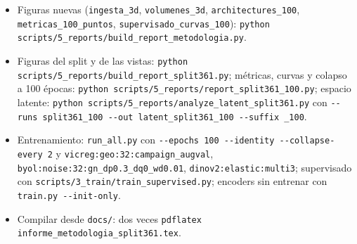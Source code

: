 \documentclass[11pt,a4paper]{article}
\begin{document}
\begin{itemize}
\item Figuras nuevas (\texttt{ingesta\_3d}, \texttt{volumenes\_3d}, \texttt{architectures\_100},
  \texttt{metricas\_100\_puntos}, \texttt{supervisado\_curvas\_100}):
  \texttt{python scripts/5\_reports/build\_report\_metodologia.py}.
\item Figuras del split y de las vistas: \texttt{python scripts/5\_reports/build\_report\_split361.py};
  métricas, curvas y colapso a 100 épocas: \texttt{python scripts/5\_reports/report\_split361\_100.py}; espacio
  latente: \texttt{python scripts/5\_reports/analyze\_latent\_split361.py} con \texttt{-{}-runs split361\_100
  -{}-out latent\_split361\_100 -{}-suffix \_100}.
\item Entrenamiento: \texttt{run\_all.py} con \texttt{-{}-epochs 100 -{}-identity -{}-collapse-every 2}
  y \nolinkurl{vicreg:geo:32:campaign_augval}, \nolinkurl{byol:noise:32:gn_dp0.3_dq0_wd0.01},
  \nolinkurl{dinov2:elastic:multi3}; supervisado con \texttt{scripts/3\_train/train\_supervised.py}; encoders
  sin entrenar con \texttt{train.py -{}-init-only}.
\item Compilar desde \texttt{docs/}: dos veces \texttt{pdflatex informe\_metodologia\_split361.tex}.
\end{itemize}
\end{document}
